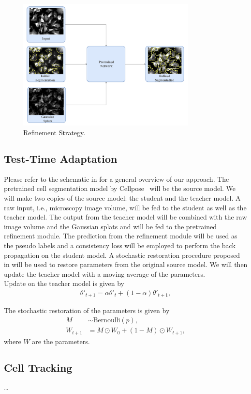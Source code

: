 \begin{figure}[t]
    \centering
    \includegraphics[width=9cm]{figs/refinement.pdf}
    \caption{Refinement Strategy.}
    \label{fig:refinement}
\end{figure}

\subsection{Test-Time Adaptation}
Please refer to the schematic in  for a general overview of our approach. The pretrained cell segmentation model by Cellpose~\cite{stringer2021cellpose} will be the source model. We will make two copies of the source model: the student and the teacher model. A raw input, i.e., microscopy image volume, will be fed to the student as well as the teacher model. The output from the teacher model will be combined with the raw image volume and the Gaussian splats and will be fed to the pretrained refinement module. The prediction from the refinement module will be used as the pseudo labels and a consistency loss will be employed to perform the back propagation on the student model. A stochastic restoration procedure proposed in \cite{wang2022continual} will be used to restore parameters from the original source model. We will then update the teacher model with a moving average of the parameters.    \\


Update on the teacher model is given by
\begin{align}
    \theta'_{t+1} = \alpha \theta'_{t} + (1-\alpha)\theta'_{t+1},
\end{align}


The stochastic restoration of the parameters is given by
\begin{align}
    M &\sim \text{Bernoulli}(p), \\
    W_{t+1} &= M \odot W_0 + (1-M) \odot W_{t+1}, 
\end{align}
where $W$ are the parameters. \\



\subsection{Cell Tracking}
\dots